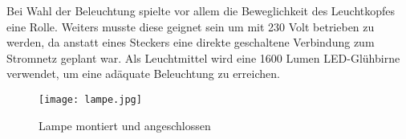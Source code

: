 Bei Wahl der Beleuchtung spielte vor allem die Beweglichkeit des Leuchtkopfes eine Rolle. 
Weiters musste diese geignet sein um mit 230 Volt betrieben zu werden, da anstatt eines Steckers eine direkte geschaltene Verbindung zum Stromnetz geplant war.
Als Leuchtmittel wird eine 1600 Lumen LED-Glühbirne verwendet, um eine adäquate Beleuchtung zu erreichen.

\begin{figure}[H]
    \begin{center}
        \texttt{[image: lampe.jpg]}
        \caption{Lampe montiert und angeschlossen}
    \end{center}
\end{figure}